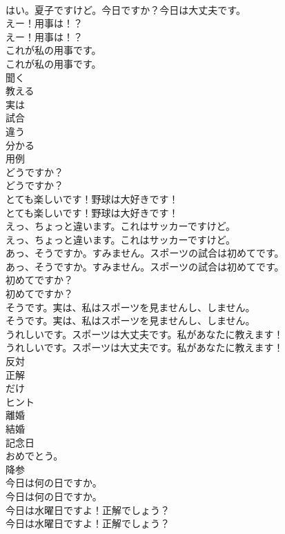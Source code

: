 \documentclass[8pt]{extreport}
\begin{document}
\begin{CJK}{UTF8}{min}
\\	はい。夏子ですけど。今日ですか？今日は大丈夫です。 
\\	えー！用事は！？	
\\	えー！用事は！？ 
\\	これが私の用事です。	
\\	これが私の用事です。 
\\	聞く
\\	教える
\\	実は
\\	試合
\\	違う
\\	分かる
\\	用例
\\	どうですか？	
\\	どうですか？ 
\\	とても楽しいです！野球は大好きです！	
\\	とても楽しいです！野球は大好きです！ 
\\	えっ、ちょっと違います。これはサッカーですけど。	
\\	えっ、ちょっと違います。これはサッカーですけど。 
\\	あっ、そうですか。すみません。スポーツの試合は初めてです。	
\\	あっ、そうですか。すみません。スポーツの試合は初めてです。 
\\	初めてですか？	
\\	初めてですか？ 
\\	そうです。実は、私はスポーツを見ませんし、しません。	
\\	そうです。実は、私はスポーツを見ませんし、しません。 
\\	うれしいです。スポーツは大丈夫です。私があなたに教えます！	
\\	うれしいです。スポーツは大丈夫です。私があなたに教えます！ 
\\	反対
\\	正解
\\	だけ
\\	ヒント
\\	離婚
\\	結婚
\\	記念日
\\	おめでとう。
\\	降参
\\	今日は何の日ですか。	
\\	今日は何の日ですか。 
\\	今日は水曜日ですよ！正解でしょう？	
\\	今日は水曜日ですよ！正解でしょう？ 

\end{CJK}
\end{document}
